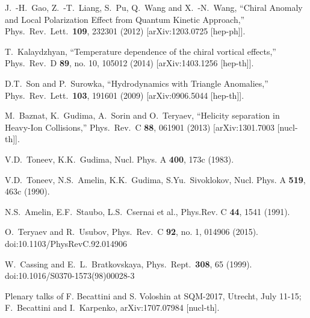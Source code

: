 \documentclass[preprint,aps,showpacs,nofootinbib,superscriptaddress,preprintnumbers,epsf,psf]{revtex4}
\begin{document}
\begin{thebibliography}{99}
  J.~-H.~Gao, Z.~-T.~Liang, S.~Pu, Q.~Wang and X.~-N.~Wang,
  ``Chiral Anomaly and Local Polarization Effect from Quantum Kinetic Approach,''
  Phys.\ Rev.\ Lett.\  {\bf 109}, 232301 (2012)
  [arXiv:1203.0725 [hep-ph]].




  T.~Kalaydzhyan,
  ``Temperature dependence of the chiral vortical effects,''
  Phys.\ Rev.\ D {\bf 89}, no. 10, 105012 (2014)
  [arXiv:1403.1256 [hep-th]].

  D.T.~Son and P.~Surowka,
  ``Hydrodynamics with Triangle Anomalies,''
  Phys.\ Rev.\ Lett.\  {\bf 103}, 191601 (2009)
  [arXiv:0906.5044 [hep-th]].

  M.~Baznat, K.~Gudima, A.~Sorin and O.~Teryaev,
  ``Helicity separation in Heavy-Ion Collisions,''
  Phys.\ Rev.\ C {\bf 88}, 061901 (2013)
  [arXiv:1301.7003 [nucl-th]].



 V.D.~Toneev, K.K.~Gudima, Nucl. Phys. A {\bf 400},
173c (1983).

 V.D.~Toneev, N.S.~Amelin, K.K.~Gudima, S.Yu.~Sivoklokov,
Nucl. Phys. A {\bf 519}, 463c (1990).

 N.S.~Amelin, E.F.~Staubo, L.S.~Csernai et al.,
Phys.Rev. C {\bf 44}, 1541 (1991).

  O.~Teryaev and R.~Usubov,
  Phys.\ Rev.\ C {\bf 92}, no. 1, 014906 (2015).
  doi:10.1103/PhysRevC.92.014906

  W.~Cassing and E.~L.~Bratkovskaya,
  Phys.\ Rept.\  {\bf 308}, 65 (1999).
  doi:10.1016/S0370-1573(98)00028-3

Plenary talks of F. Becattini and S. Voloshin at SQM-2017, Utrecht, July 11-15;
  F.~Becattini and I.~Karpenko,
  arXiv:1707.07984 [nucl-th].





\end{thebibliography}
\end{document}
